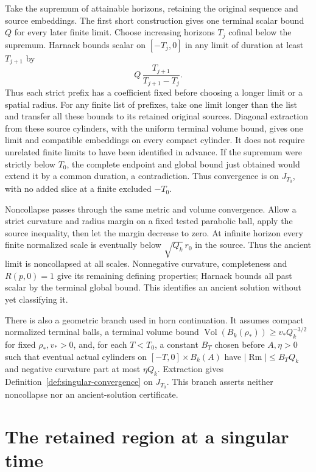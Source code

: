 Take the supremum of attainable horizons, retaining the original sequence
and source embeddings. The first short construction gives one terminal
scalar bound $Q$ for every later finite limit. Choose increasing horizons
$T_j$ cofinal below the supremum. Harnack bounds scalar on $[-T_j,0]$ in
any limit of duration at least $T_{j+1}$ by
\[
 Q\,\frac{T_{j+1}}{T_{j+1}-T_j}.
\]
Thus each strict prefix has a coefficient fixed before choosing a longer
limit or a spatial radius. For any finite list of prefixes, take one limit
longer than the list and transfer all these bounds to its retained original
sources. Diagonal extraction from these source cylinders, with the uniform
terminal volume bound, gives one limit and compatible embeddings on every
compact cylinder. It does not require unrelated finite limits to have been
identified in advance. If the supremum were
strictly below $T_0$, the complete endpoint and global bound just obtained
would extend it by a common duration, a contradiction. Thus convergence is
on $J_{T_0}$, with no added slice at a finite excluded $-T_0$.

Noncollapse passes through the same metric and volume convergence.
Allow a strict curvature and radius margin on a fixed tested parabolic
ball, apply the source inequality, then let the margin decrease to zero.
At infinite horizon every finite normalized scale is eventually below
$\sqrt{Q_k}\,r_0$ in the source. Thus the ancient limit is noncollapsed
at all scales. Nonnegative curvature, completeness and $R(p,0)=1$ give
its remaining defining properties; Harnack bounds all past scalar by the
terminal global bound. This identifies an ancient solution without yet
classifying it.

There is also a geometric branch used in horn continuation. It assumes
compact normalized terminal balls, a terminal volume bound
$\operatorname{Vol}(B_k(\rho_*))\geq v_*Q_k^{-3/2}$ for fixed
$\rho_*,v_*>0$, and, for each $T<T_0$, a constant $B_T$ chosen before
$A,\eta>0$ such that eventual actual cylinders on $[-T,0]\times B_k(A)$
have $|\operatorname{Rm}|\leq B_TQ_k$ and negative curvature part at
most $\eta Q_k$. Extraction gives
Definition~\ref{def:singular-convergence} on $J_{T_0}$. This branch asserts
neither noncollapse nor an ancient-solution certificate.

\section{The retained region at a singular time}
\label{sec:singular-retained}

